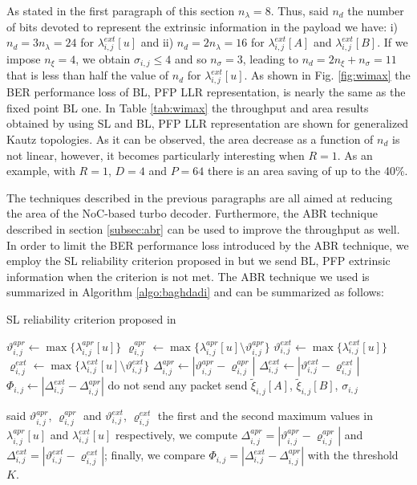 \documentclass[10pt,twocolumn,journal]{IEEEtran}
\begin{document}
As stated in the first paragraph of this section $n_{\lambda}=8$. Thus, said $n_d$ the number of bits 
devoted to represent the extrinsic information in the payload we have: i) $n_d=3n_{\lambda}=24$ for $\lambda^{ext}_{i,j}[u]$ and
ii) $n_d=2n_{\lambda}=16$ for $\lambda^{ext}_{i,j}[A]$ and $\lambda^{ext}_{i,j}[B]$.
If we impose $n_{\xi}=4$, we obtain $\sigma_{i,j} \le 4$ and so $n_{\sigma}=3$, leading to $n_d=2n_{\xi}+n_{\sigma}=11$ that is less 
than half the value of $n_d$ for $\lambda^{ext}_{i,j}[u]$. As shown in Fig. \ref{fig:wimax} the BER performance loss 
of BL, PFP LLR representation, is nearly the same as the fixed point BL one.
In Table \ref{tab:wimax} the throughput and area results obtained by using SL and BL, PFP LLR 
representation are shown for generalized Kautz topologies. 
As it can be observed, the area decrease as a function of $n_d$ is not linear, however, 
it becomes particularly interesting when $R=1$. As an example, with $R=1$, $D=4$ and $P=64$ there is an area saving of up to the 40\%.

The techniques described in the previous paragraphs are all aimed at reducing the area of the NoC-based turbo 
decoder. Furthermore, the ABR technique described in section \ref{subsec:abr} can be used to improve the throughput 
as well. In order to limit the BER performance loss introduced by the ABR technique, we employ the SL
reliability criterion proposed in \cite{baghdadi_EL06} but we send BL, PFP extrinsic information
when the criterion is not met. The ABR technique we used is summarized in Algorithm \ref{algo:baghdadi} and can be summarized as follows:
\begin{algorithm}
  \caption{SL reliability criterion proposed in \cite{baghdadi_EL06} }
  \label{algo:baghdadi}
  \begin{algorithmic}[1]
    \STATE $\vartheta^{apr}_{i,j} \leftarrow \max \{\lambda^{apr}_{i,j}[u]\}$ 
    \STATE $\varrho^{apr}_{i,j} \leftarrow \max \{\lambda^{apr}_{i,j}[u] \setminus \vartheta^{apr}_{i,j}\}$ 
    \STATE $\vartheta^{ext}_{i,j} \leftarrow \max \{\lambda^{ext}_{i,j}[u]\}$
    \STATE $\varrho^{ext}_{i,j} \leftarrow \max \{\lambda^{ext}_{i,j}[u] \setminus \vartheta^{ext}_{i,j}\}$ 
    \STATE $\Delta^{apr}_{i,j} \leftarrow |\vartheta^{apr}_{i,j}-\varrho^{apr}_{i,j}|$ 
    \STATE $\Delta^{ext}_{i,j} \leftarrow |\vartheta^{ext}_{i,j}-\varrho^{ext}_{i,j}|$ 
    \STATE $\Phi_{i,j} \leftarrow |\Delta^{ext}_{i,j}-\Delta^{apr}_{i,j}|$
    \STATE do not send any packet
    \ELSE
    \STATE send $\tilde{\xi}_{i,j}[A]$, $\tilde{\xi}_{i,j}[B]$, $\sigma_{i,j}$
    \ENDIF
  \end{algorithmic}
\end{algorithm}
said $\vartheta^{apr}_{i,j}$, $\varrho^{apr}_{i,j}$ and 
$\vartheta^{ext}_{i,j}$, $\varrho^{ext}_{i,j}$ 
the first and the second maximum values in $\lambda^{apr}_{i,j}[u]$ and $\lambda^{ext}_{i,j}[u]$ respectively, we 
compute $\Delta^{apr}_{i,j}=|\vartheta^{apr}_{i,j}-\varrho^{apr}_{i,j}|$ and 
$ \Delta^{ext}_{i,j}=|\vartheta^{ext}_{i,j}-\varrho^{ext}_{i,j}|$; finally, we compare 
$\Phi_{i,j}=|\Delta^{ext}_{i,j}-\Delta^{apr}_{i,j}|$ with the threshold $K$.
\end{document}
